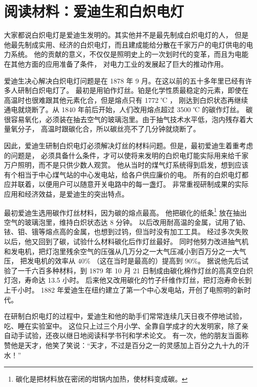 \section*{阅读材料：爱迪生和白炽电灯}

大家都说白炽电灯是爱迪生发明的。其实他并不是最先制成白炽电灯的人，
但是他最先制成实用、经济的白炽电灯，而且建成能给分散在千家万户的电灯供电的电力系统。
他的贡献的意义，不仅仅是照明史上的一次划时代的变革，而且为电能在其他方面的应用准备了条件，
对电力工业的发展起了巨大的推动作用。

爱迪生决心解决白炽电灯问题是在 1878 年 9 月。在这以前的五十多年里已经有许多人研制白炽电灯了。
最初是用铂作灯丝。铂是化学性质最稳定的元素，即使在高温时也很难跟其他元素化合，但是熔点只有 1772 ℃ ，
刚达到白炽状态再继续通电就烧断了。从 1840 年前后开始，人们改用熔点超过 3500 ℃ 的碳作灯丝。
碳很容易氧化，必须装在抽去空气的玻璃泡里。由于抽气技术水平低，泡内残存着大量氧分子，
高温时跟碳化合，所以碳丝亮不了几分钟就烧断了。

因此，爱迪生研制白炽电灯必须解决灯丝的材料问题。但是，最初爱迪生着重考虑的问题是，
必须具备什么条件，才可以使将来发明的白炽电灯能实际用来给千家万户照明，而不是只供少数人观赏。
他从当时的煤气灯系统得到启发，想到应该有个相当于中心煤气站的中心发电站，给各户供应廉价的电。
所有的白炽电灯都应并联着，以便用户可以随意开关电路中的每一盏灯。
非常重视研制成果的实际应用和经济效益，是爱迪生的突出特点。

最初爱迪生选用碳作灯丝材料，因为碳的熔点最高。
他把碳化的纸条\footnote{碳化是把材料放在密闭的坩锅内加热，使材料变成碳。}
放在抽出空气的玻璃泡里，维持白炽状态达 8 分钟。
以后改用耐高温的金属，试用了铂、铱、钼、锇等熔点高的金属，也想到过钨，但当时没有加工工具。
经过多次失败以后，他又回到了碳，试验什么材料碳化后作灯丝最好。
同时他努力改进抽气机和发电机，把灯泡里残余空气的压强从几万分之一大气压减小到百万分之一大气压，
把发电机的效率从 $40\%$ （这在当时是最高的）提高到 $90\%$。
据说他先后试验了一千六百多种材料，到 1879 年 10 月 21 日制成由碳化棉作灯丝的高真空白炽灯泡，寿命达 13.5 小时。
后来他又改用碳化的竹子纤维作灯丝，把灯泡寿命长到上千小时。
1882 年爱迪生在纽约建立了第一个中心发电站，开创了电照明的新时代。

在研制白炽电灯的过程中，爱迪生和他的助手们常常连续几天日夜不停地试验，吃、睡在实验室中。
这位只上过三个月小学、全靠自学成才的大发明家，除了亲自动手试验，还夜以继日地阅读科学书刊和学术论文。
有一次，他的朋友当面称赞他是天才，他笑了笑说：“天才，不过是百分之一的灵感加上百分之九十九的汗水！”



\lianxi

